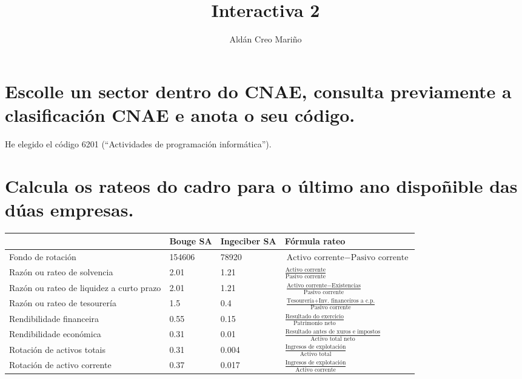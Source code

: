 \documentclass[a4paper]{article}
\title{Interactiva 2}
\author{Aldán Creo Mariño}
\begin{document}
\maketitle

\section{Escolle un sector dentro do CNAE, consulta previamente a clasificación CNAE e anota o seu código.}

He elegido el código 6201 (``Actividades de programación informática'').

\section{Calcula os rateos do cadro para o último ano dispoñible das dúas empresas.}

\begin{center}
    \begin{tabular}{ | p{5cm} | p{2cm} | p{2cm} | p{5cm} | }
        \hline
      & Bouge SA & Ingeciber SA & Fórmula rateo \\ \hline
      Fondo de rotación & 154606 & 78920 & $\text{Activo corrente} - \text{Pasivo corrente}$ \\ \hline
      Razón ou rateo de solvencia & 2.01 & 1.21 & $\frac{\text{Activo corrente}}{\text{Pasivo corrente}}$ \\ \hline
      Razón ou rateo de liquidez a curto prazo & 2.01 & 1.21 & $\frac{\text{Activo corrente} - \text{Existencias}}{\text{Pasivo corrente}}$ \\ \hline
      Razón ou rateo de tesourería & 1.5 & 0.4 & $\frac{\text{Tesourería} + \text{Inv. financeiros a c.p.}}{\text{Pasivo corrente}}$ \\ \hline
      Rendibilidade financeira & 0.55 & 0.15 & $\frac{\text{Resultado do exercicio}}{\text{Patrimonio neto}}$ \\ \hline
      Rendibilidade económica & 0.31 & 0.01 & $\frac{\text{Resultado antes de xuros e impostos}}{\text{Activo total neto}}$ \\ \hline
      Rotación de activos totais & 0.31 & 0.004 & $\frac{\text{Ingresos de explotación}}{\text{Activo total}}$ \\ \hline
      Rotación de activo corrente & 0.37 & 0.017 & $\frac{\text{Ingresos de explotación}}{\text{Activo corrente}}$ \\ \hline
    \end{tabular}
\end{center}
\end{document}
